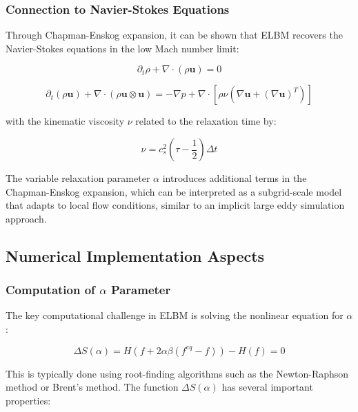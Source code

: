 \documentclass[12pt,a4paper]{article}
\begin{document}
\subsubsection{Connection to Navier-Stokes Equations}

Through Chapman-Enskog expansion, it can be shown that ELBM recovers the Navier-Stokes equations in the low Mach number limit:

\begin{equation}
\partial_t \rho + \nabla \cdot (\rho \mathbf{u}) = 0
\end{equation}

\begin{equation}
\partial_t (\rho \mathbf{u}) + \nabla \cdot (\rho \mathbf{u} \otimes \mathbf{u}) = -\nabla p + \nabla \cdot [\rho \nu (\nabla \mathbf{u} + (\nabla \mathbf{u})^T)]
\end{equation}

with the kinematic viscosity $\nu$ related to the relaxation time by:

\begin{equation}
\nu = c_s^2 \left(\tau - \frac{1}{2}\right) \Delta t
\end{equation}

The variable relaxation parameter $\alpha$ introduces additional terms in the Chapman-Enskog expansion, which can be interpreted as a subgrid-scale model that adapts to local flow conditions, similar to an implicit large eddy simulation approach.

\subsection{Numerical Implementation Aspects}

\subsubsection{Computation of $\alpha$ Parameter}

The key computational challenge in ELBM is solving the nonlinear equation for $\alpha$:

\begin{equation}
\Delta S(\alpha) = H(f + 2\alpha\beta(f^{eq} - f)) - H(f) = 0
\end{equation}

This is typically done using root-finding algorithms such as the Newton-Raphson method or Brent's method. The function $\Delta S(\alpha)$ has several important properties:
\end{document}

